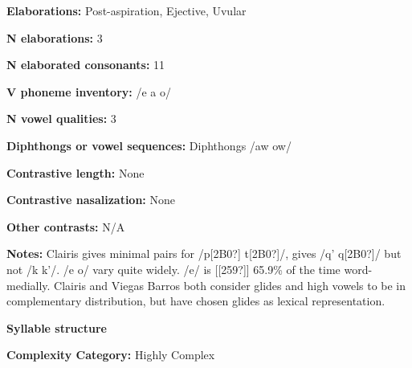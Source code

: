 \begin{styleBody}
\textbf{Elaborations:} Post-aspiration, Ejective, Uvular
\end{styleBody}

\begin{styleBody}
\textbf{N elaborations:} 3
\end{styleBody}

\begin{styleBody}
\textbf{N elaborated consonants: }11
\end{styleBody}

\begin{styleBody}
\textbf{V phoneme inventory:} /e a o/
\end{styleBody}

\begin{styleBody}
\textbf{N vowel qualities:} 3
\end{styleBody}

\begin{styleBody}
\textbf{Diphthongs or vowel sequences:} Diphthongs /aw ow/
\end{styleBody}

\begin{styleBody}
\textbf{Contrastive length:} None
\end{styleBody}

\begin{styleBody}
\textbf{Contrastive nasalization:} None
\end{styleBody}

\begin{styleBody}
\textbf{Other contrasts:} N/A
\end{styleBody}

\begin{styleBody}
\textbf{Notes: }Clairis gives minimal pairs for /p[2B0?] t[2B0?]/, gives /q’ q[2B0?]/ but not /k k’/. /e o/ vary quite widely. /e/ is [[259?]] 65.9\% of the time word-medially. Clairis and Viegas Barros both consider glides and high vowels to be in complementary distribution, but have chosen glides as lexical representation.
\end{styleBody}

\begin{styleBody}
\textbf{Syllable structure}
\end{styleBody}

\begin{styleBody}
\textbf{Complexity Category: }Highly Complex
\end{styleBody}

